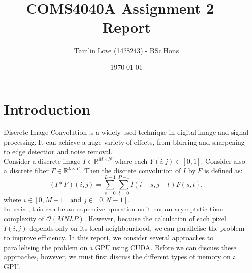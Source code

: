 \documentclass[10pt]{article}
\begin{document}
\title{COMS4040A Assignment 2 -- Report}
\author{Tamlin Love (1438243) - BSc Hons}
\date{\today} 
\maketitle 
\pagestyle{fancy}
\fancyhf{}
\fancyhead[R]{\thepage}
{} 
\vspace{-1.5cm}
\section{Introduction}\label{Introduction}
Discrete Image Convolution is a widely used technique in digital image and signal processing. It can achieve a huge variety of effects, from blurring and sharpening to edge detection and noise removal. 
\\
Consider a discrete image $I \in \mathbb{R}^{M \times N}$ where each $Y(i,j) \in [0,1]$. Consider also a discrete filter $F \in \mathbb{R}^{L \times P}$. Then the discrete convolution of $I$ by $F$ is defined as:
\begin{equation}
(I*F)(i,j) = \sum_{s=0}^{L-1}\sum_{t=0}^{P-1} I(i-s,j-t)F(s,t),
\end{equation}
where $i\in[0,M-1]$ and $j\in[0,N-1]$.
\\
In serial, this can be an expensive operation as it has an asymptotic time complexity of $\mathcal{O}(MNLP)$. However, because the calculation of each pixel $I(i,j)$ depends only on its local neighbourhood, we can parallelise the problem to improve efficiency. In this report, we consider several approaches to parallelising the problem on a GPU using CUDA. Before we can discuss these approaches, however, we must first discuss the different types of memory on a GPU.
\end{document}
